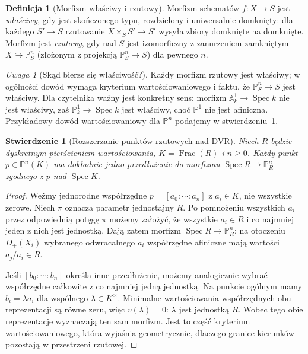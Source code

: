 \documentclass[11pt,a4paper,openany]{report}
\numberwithin{equation}{section}
\theoremstyle{plain}
\newtheorem{stwierdzenie}[twierdzenie]{Stwierdzenie}
\theoremstyle{definition}
\newtheorem{definicja}[twierdzenie]{Definicja}
\theoremstyle{remark}
\newtheorem{uwaga}[twierdzenie]{Uwaga}
\newcommand{\A}{\mathbb A}
\newcommand{\PP}{\mathbb P}
\newcommand{\Spec}{\operatorname{Spec}}
\newcommand{\Frac}{\operatorname{Frac}}
\begin{document}
\begin{definicja}[Morfizm właściwy i rzutowy]
\label{def:ga5-proper}
Morfizm schematów $f:X\to S$ jest \emph{właściwy}, gdy jest
skończonego typu, rozdzielony i uniwersalnie domknięty:
dla każdego $S'\to S$ rzutowanie
$X\times_S S'\to S'$ wysyła zbiory domknięte na domknięte.
Morfizm jest \emph{rzutowy}, gdy nad $S$ jest izomorficzny
z zanurzeniem zamkniętym $X\hookrightarrow\PP^n_S$
(złożonym z projekcją $\PP^n_S\to S$) dla pewnego $n$.
\end{definicja}

\begin{uwaga}[Skąd bierze się właściwość?]
Każdy morfizm rzutowy jest właściwy; w ogólności dowód wymaga
kryterium wartościowaniowego i faktu, że $\PP^n_S\to S$ jest
właściwy. Dla czytelnika ważny jest konkretny sens:
morfizm $\A^1_k\to\Spec k$ nie jest właściwy, zaś
$\PP^1_k\to\Spec k$ jest właściwy, choć $\PP^1$ nie jest
afiniczna. Przykładowy dowód wartościowaniowy dla
$\PP^n$ podajemy w stwierdzeniu~\ref{st:ga5-valuative-projective}.
\end{uwaga}

\begin{stwierdzenie}[Rozszerzanie punktów rzutowych nad DVR]
\label{st:ga5-valuative-projective}
Niech $R$ będzie dyskretnym pierścieniem wartościowania,
$K=\Frac(R)$ i $n\ge0$. Każdy punkt $p\in\PP^n(K)$
ma dokładnie jedno przedłużenie do morfizmu
$\Spec R\to\PP^n_R$ zgodnego z $p$ nad $\Spec K$.
\end{stwierdzenie}
\begin{proof}
Weźmy jednorodne współrzędne $p=[a_0:\cdots:a_n]$
z $a_i\in K$, nie wszystkie zerowe. Niech $\pi$ oznacza
parametr jednostajny $R$. Po pomnożeniu wszystkich
$a_i$ przez odpowiednią potęgę $\pi$ możemy założyć,
że wszystkie $a_i\in R$ i co najmniej jeden z nich jest
jednostką. Dają zatem morfizm $\Spec R\to\PP^n_R$:
na otoczeniu $D_+(X_i)$ wybranego odwracalnego $a_i$
współrzędne afiniczne mają wartości $a_j/a_i\in R$.

Jeśli $[b_0:\cdots:b_n]$ określa inne przedłużenie,
możemy analogicznie wybrać współrzędne całkowite z
co najmniej jedną jednostką. Na punkcie ogólnym mamy
$b_i=\lambda a_i$ dla wspólnego $\lambda\in K^\times$.
Minimalne wartościowania współrzędnych obu reprezentacji
są równe zeru, więc $v(\lambda)=0$: $\lambda$ jest
jednostką $R$. Wobec tego obie reprezentacje wyznaczają
ten sam morfizm. Jest to część kryterium wartościowaniowego,
która wyjaśnia geometrycznie, dlaczego granice kierunków
pozostają w przestrzeni rzutowej.
\end{proof}
\end{document}
